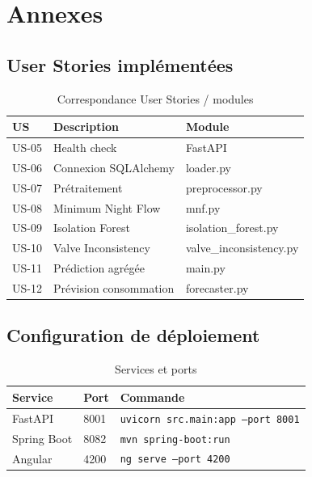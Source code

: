 \chapter{Annexes}

\section{User Stories implémentées}

\begin{table}[H]
  \centering
  \caption{Correspondance User Stories / modules}
  \begin{tabular}{lll}
    \toprule
    \textbf{US} & \textbf{Description} & \textbf{Module} \\
    \midrule
    US-05 & Health check & FastAPI \\
    US-06 & Connexion SQLAlchemy & loader.py \\
    US-07 & Prétraitement & preprocessor.py \\
    US-08 & Minimum Night Flow & mnf.py \\
    US-09 & Isolation Forest & isolation\_forest.py \\
    US-10 & Valve Inconsistency & valve\_inconsistency.py \\
    US-11 & Prédiction agrégée & main.py \\
    US-12 & Prévision consommation & forecaster.py \\
    \bottomrule
  \end{tabular}
\end{table}

\section{Configuration de déploiement}

\begin{table}[H]
  \centering
  \caption{Services et ports}
  \begin{tabular}{lll}
    \toprule
    \textbf{Service} & \textbf{Port} & \textbf{Commande} \\
    \midrule
    FastAPI & 8001 & \texttt{uvicorn src.main:app --port 8001} \\
    Spring Boot & 8082 & \texttt{mvn spring-boot:run} \\
    Angular & 4200 & \texttt{ng serve --port 4200} \\
    \bottomrule
  \end{tabular}
\end{table}

